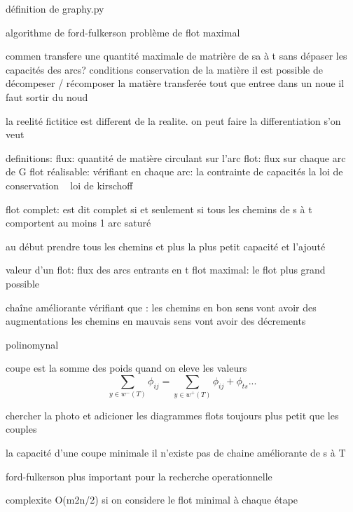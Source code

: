 \documentclass{article}
\begin{document}
définition de graphy.py


algorithme de ford-fulkerson
problème de flot maximal

commen transfere une quantité maximale de matrière de sa à t sans dépaser les capacités des arcs?
conditions
    conservation de la matière
    il est possible de décompeser / récomposer la matière transferée
        tout que entree dans un noue il faut sortir du noud

la reelité fictitice est different de la realite. on peut faire la differentiation s'on veut

definitions:
flux: quantité de matière circulant sur l'arc
flot: flux sur chaque arc de G
flot réalisable: vérifiant en chaque arc:
    la contrainte de capacités
    la loi de conservation ~ loi de kirschoff

flot complet: est dit complet si et seulement si tous les chemins de s à t comportent au moins 1 arc saturé

au début prendre tous les chemins et plus la plus petit capacité et l'ajouté

valeur d'un flot:
    flux des arcs entrants en t
    flot maximal: le flot plus grand possible

chaîne améliorante
    vérifiant que :
        les chemins en bon sens vont avoir des augmentations
        les chemins en mauvais sens vont avoir des décrements

polinomynal

coupe est la somme des poids quand on eleve les valeurs
\begin{equation}
    \sum_{y \in w^{-}(T)} \phi_{ij} = \sum_{y \in w^{+}(T)} \phi_{ij} + \phi_{ts} ...
\end{equation}

chercher la photo et adicioner les diagrammes
flots toujours plus petit que les couples

la capacité d'une coupe minimale
il n'existe pas de chaine améliorante de s à T

ford-fulkerson plus important pour la recherche operationnelle


complexite O(m2n/2)
    si on considere le flot minimal à chaque étape
    
\end{document}
